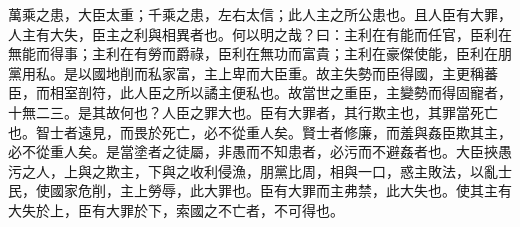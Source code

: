 \begin{pinyinscope}
萬乘之患，大臣太重；千乘之患，左右太信；此人主之所公患也。且人臣有大罪，人主有大失，臣主之利與相異者也。何以明之哉？曰：主利在有能而任官，臣利在無能而得事；主利在有勞而爵祿，臣利在無功而富貴；主利在豪傑使能，臣利在朋黨用私。是以國地削而私家富，主上卑而大臣重。故主失勢而臣得國，主更稱蕃臣，而相室剖符，此人臣之所以譎主便私也。故當世之重臣，主變勢而得固寵者，十無二三。是其故何也？人臣之罪大也。臣有大罪者，其行欺主也，其罪當死亡也。智士者遠見，而畏於死亡，必不從重人矣。賢士者修廉，而羞與姦臣欺其主，必不從重人矣。是當塗者之徒屬，非愚而不知患者，必污而不避姦者也。大臣挾愚污之人，上與之欺主，下與之收利侵漁，朋黨比周，相與一口，惑主敗法，以亂士民，使國家危削，主上勞辱，此大罪也。臣有大罪而主弗禁，此大失也。使其主有大失於上，臣有大罪於下，索國之不亡者，不可得也。


\end{pinyinscope}